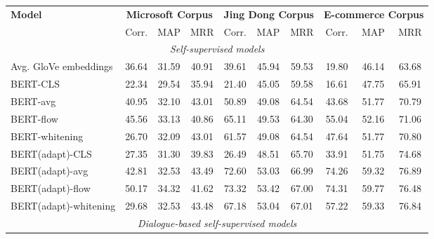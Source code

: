 \documentclass[11pt]{article}
\begin{document}
\begin{table}[htb]
    \centering
    \small
    \begin{tabular}{l|ccc|ccc|ccc}
        \toprule
    
        
        \multirow{2}{*}{\textbf{ Model}} 
        & \multicolumn{3}{c}{\textbf{Microsoft Corpus}} 
        & \multicolumn{3}{|c}{\textbf{Jing Dong Corpus}}
        & \multicolumn{3}{|c}{\textbf{E-commerce Corpus}}\\
        
        
        & Corr. & MAP & MRR  
        & Corr. & MAP & MRR
        & Corr. & MAP & MRR   \\
        
        \midrule
        \midrule
        \multicolumn{10}{c}{\textit{Self-supervised models}} \\
        \midrule

        Avg. GloVe embeddings & 36.64 & 31.59 & 40.91 & 39.61 & 45.94 & 59.53 & 19.80 & 46.14 & 63.68  \\
        BERT-CLS & 22.34 & 29.54 & 35.94 & 21.40 & 45.05 & 59.58 & 16.61 & 47.75 & 65.91   \\
        BERT-avg & 40.95 & 32.10 & 43.01  & 50.89 & 49.08 & 64.54  & 43.68 & 51.77 & 70.79   \\
        BERT-flow & 45.56 & 33.13 & 40.86  & 65.11 & 49.53 & 64.30 & 55.04  & 52.16 & 71.06   \\
        BERT-whitening & 26.70 & 32.09 & 43.01 & 61.57 & 49.08 & 64.54 & 47.64 & 51.77 & 70.80 \\
        
        \midrule
        
        BERT(adapt)-CLS & 27.35 & 31.30 & 39.83 & 26.49 & 48.51 & 65.70 & 33.91 & 51.75 &  74.68 \\
        BERT(adapt)-avg  & 42.81 & 32.53 & 43.49  & 72.60 & 53.03 & 66.99 & 74.26 & 59.32 & 76.89   \\
        BERT(adapt)-flow  & 50.17 & 34.32 & 41.62 & 73.32 & 53.42 & 67.00 & 74.31 & 59.77 & 76.48 \\
        BERT(adapt)-whitening   & 29.68 & 32.53 & 43.48 & 67.18 & 53.04 & 67.01 & 57.22 & 59.33 & 76.84 \\
        
        \midrule
        \midrule
        \multicolumn{10}{c}{\textit{Dialogue-based self-supervised models}} \\
        \midrule
        

\end{tabular}
\end{table}
\end{document}
